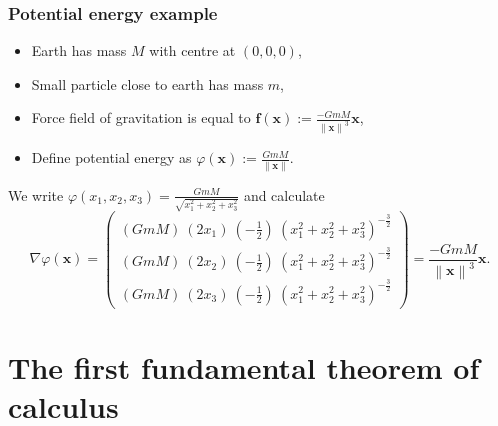 \documentclass[aspectratio=169,handout]{beamer}
\newcommand{\norm}[1]{\left\|#1\right\|} %
\newcommand{\ff}{\mathbf{f}}
\newcommand{\xx}{\mathbf{x}}
\begin{document}
\begin{frame}
    \frametitle{Potential energy example}

    \begin{itemize}
        \item Earth has mass \(M\) with centre at \((0,0,0)\),
        \item Small particle close to earth has mass \(m\),
        \item Force field of gravitation is equal to
              \(\ff(\xx) := \frac{-GmM}{\norm{\xx}^3}\xx\),
        \item Define potential energy as
              \(\varphi(\xx):= \frac{GmM}{\norm{\xx}}\).
    \end{itemize}

    We write \(\varphi(x_1,x_2,x_3) = \frac{GmM}{\sqrt{x_1^2 + x_2^2 + x_3^2}}\)
    and calculate
    \[
        \nabla \varphi(\xx) =
        \begin{pmatrix}
            {(GmM) \ (2x_1)} \ {(-\frac{1}{2}) \ (x_1^2 + x_2^2 + x_3^2)^{-\frac{3}{2}}} \\
            {(GmM) \ (2x_2)} \ {(-\frac{1}{2}) \ (x_1^2 + x_2^2 + x_3^2)^{-\frac{3}{2}}} \\
            {(GmM) \ (2x_3)} \ {(-\frac{1}{2}) \ (x_1^2 + x_2^2 + x_3^2)^{-\frac{3}{2}}}
        \end{pmatrix}
        =   \frac{-GmM}{\norm{\xx}^3}\xx.
    \]


\end{frame}

\section{The first fundamental theorem of calculus}
\end{document}
